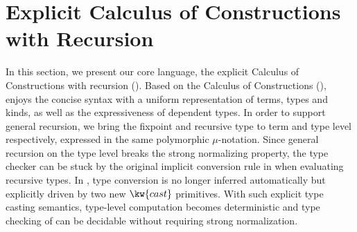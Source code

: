 \section{Explicit Calculus of Constructions with Recursion}
\label{sec:formal}




In this section, we present our core language, the explicit Calculus of Constructions with recursion (\name). Based on the Calculus of Constructions (\cc), \name enjoys the concise syntax with a uniform representation of terms, types and kinds, as well as the expressiveness of dependent types. In order to support general recursion, we bring the fixpoint and recursive type to term and type level respectively, expressed in the same polymorphic $\mu$-notation. Since general recursion on the type level breaks the strong normalizing property, the type checker can be stuck by the original implicit conversion rule in \cc when evaluating recursive types. In \name, type conversion is no longer inferred automatically but explicitly driven by two new $\kw{cast}$ primitives. With such explicit type casting semantics, type-level computation becomes deterministic and type checking of \name can be decidable without requiring strong normalization.

